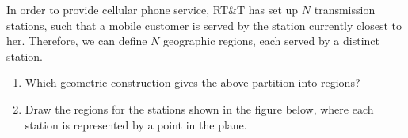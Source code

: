 In order to provide cellular phone service, RT\&T  has set up $N$
transmission stations, such that a mobile customer is served by the
station currently closest to her.  Therefore, we can define $N$
geographic regions, each served by a distinct station.

\begin{enumerate}

\item  Which geometric construction gives the above partition into regions?

\item  Draw the regions for the stations shown in the figure below,
where each station is represented by a point in the plane.

\end{enumerate}

 \vspace{4mm} \par
\begin{figure}[h]
\centerline{}\end{figure}
 \par
\vspace{4mm}
